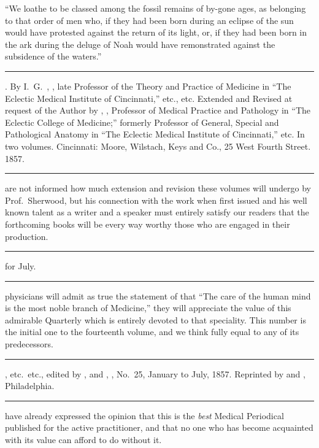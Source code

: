 
``We loathe to be classed among the fossil remains of by-gone ages,
as belonging to that order of men who, if they had been born during
an eclipse of the sun would have protested against the return of its
light, or, if they had been born in the ark during the deluge of Noah
would have remonstrated against the subsidence of the waters.''

\fancybreak{* * *}
\footnotesize
{}. By I.~G.\ , \md, late Professor of the
Theory and Practice of Medicine in ``The Eclectic Medical Institute of Cincinnati,''
etc., etc. Extended and Revised at request of the Author by , \md,
Professor of Medical Practice and Pathology in ``The Eclectic College of Medicine;''
formerly Professor of General, Special and Pathological Anatomy in ``The Eclectic
Medical Institute of Cincinnati,'' etc. In two volumes. Cincinnati: Moore, Wilstach,
Keys and Co., 25 West Fourth Street. 1857.
\plainbreak{1}
\normalsize

 are not informed how much extension and revision these volumes
will undergo by Prof.\ Sherwood, but his connection with the work when
first issued and his well known talent as a writer and a speaker must
entirely satisfy our readers that the forthcoming books will be every
way worthy those who are engaged in their production.

\fancybreak{* * *}
\footnotesize
{} for July.
\plainbreak{1}
\normalsize

 physicians will admit as true the statement of  that ``The
care of the human mind is the most noble branch of Medicine,'' they
will appreciate the value of this admirable Quarterly which is entirely
devoted to that speciality. This number is the initial one to the fourteenth
volume, and we think fully equal to any of its predecessors.

\fancybreak{* * *}
\footnotesize
{}, etc.\ etc., edited by , \md
and , \md, No.\ 25, January to July, 1857. Reprinted by  and
, Philadelphia.
\plainbreak{1}
\normalsize

 have already expressed the opinion that this is the \emph{best} Medical
Periodical published for the active practitioner, and that no one who
has become acquainted with its value can afford to do without it.


